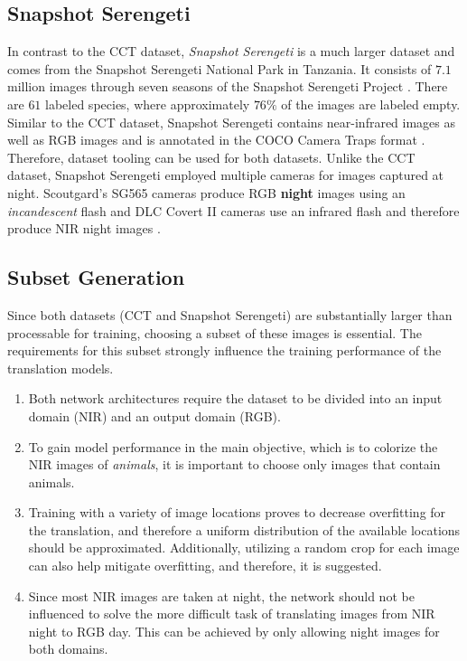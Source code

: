\documentclass[a4paper,11pt, DIV=12]{scrartcl}
\begin{document}
\subsection{Snapshot Serengeti}
In contrast to the CCT dataset, \textit{Snapshot Serengeti} is a much larger dataset and comes from the Snapshot Serengeti National Park in Tanzania.
It consists of $7.1$ million images through seven seasons of the Snapshot Serengeti Project \cite{serengeti}.
There are $61$ labeled species, where approximately $76\%$ of the images are labeled empty.
Similar to the CCT dataset, Snapshot Serengeti contains near-infrared images as well as RGB images and
is annotated in the COCO Camera Traps format \cite{serengeti}. Therefore, dataset tooling can be used for both datasets.
Unlike the CCT dataset, Snapshot Serengeti employed multiple cameras for images captured at night.
Scoutgard's SG565 cameras produce RGB \textbf{night} images using an \textit{incandescent} flash and DLC Covert II cameras use an infrared flash and therefore produce NIR night images \cite{serengeti}.

\subsection{Subset Generation}
Since both datasets (CCT and Snapshot Serengeti) are substantially larger than processable for training, choosing a subset of these images is essential.
The requirements for this subset strongly influence the training performance of the translation models.

\begin{enumerate}
   \item Both network architectures require the dataset to be divided into an input domain (NIR) and an output domain (RGB). \label{item:requirement-split}
   \item To gain model performance in the main objective, which is to colorize the NIR images of \textit{animals}, it is important to choose only images that contain animals. \label{item:requirement-animal-filter}
   \item Training with a variety of image locations proves to decrease overfitting for the translation, and therefore a uniform distribution of the available locations should be approximated.
         Additionally, utilizing a random crop for each image can also help mitigate overfitting, and therefore, it is suggested. \label{item:requirement-weighted-sampling}
   \item Since most NIR images are taken at night, the network should not be influenced to solve the more difficult
         task of translating images from NIR night to RGB day. This can be achieved by only allowing night images for both
         domains. \label{item:requirement-night}
\end{enumerate}
\end{document}

